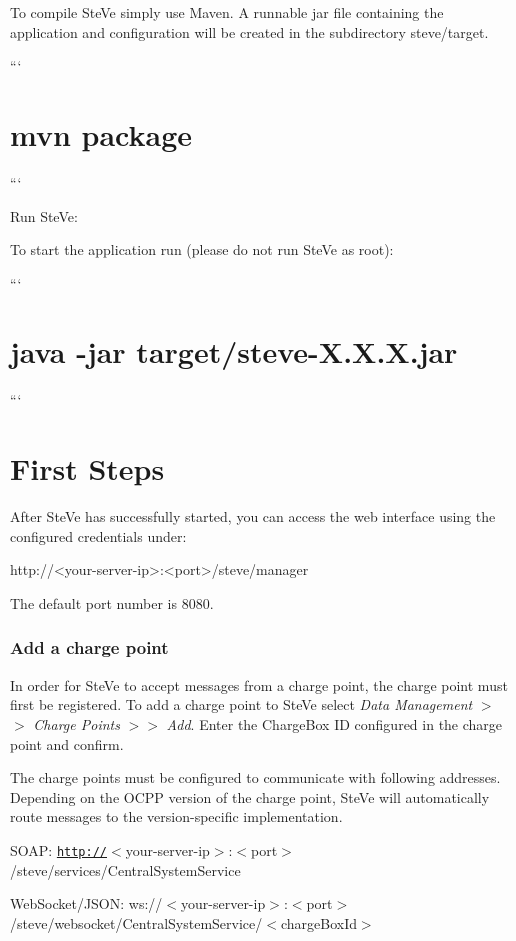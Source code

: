 \begin{DoxyEnumerate}
To compile Ste\+Ve simply use Maven. A runnable {\ttfamily jar} file containing the application and configuration will be created in the subdirectory {\ttfamily steve/target}.

``` \section*{mvn package}

```
\item Run Ste\+Ve\+:

To start the application run (please do not run Ste\+Ve as root)\+:

``` \section*{java -\/jar target/steve-\/\+X.\+X.\+X.\+jar}

```
\end{DoxyEnumerate}

\section*{First Steps}

After Ste\+Ve has successfully started, you can access the web interface using the configured credentials under\+: \begin{DoxyVerb}http://<your-server-ip>:<port>/steve/manager
\end{DoxyVerb}


The default port number is 8080.

\subsubsection*{Add a charge point}


\begin{DoxyEnumerate}
\item In order for Ste\+Ve to accept messages from a charge point, the charge point must first be registered. To add a charge point to Ste\+Ve select {\itshape Data Management} $>$$>$ {\itshape Charge Points} $>$$>$ {\itshape Add}. Enter the Charge\+Box I\+D configured in the charge point and confirm.
\item The charge points must be configured to communicate with following addresses. Depending on the O\+C\+P\+P version of the charge point, Ste\+Ve will automatically route messages to the version-\/specific implementation.
\begin{DoxyItemize}
\item S\+O\+A\+P\+: {\ttfamily \href{http://}{\tt http\+://}$<$your-\/server-\/ip$>$\+:$<$port$>$/steve/services/\+Central\+System\+Service}
\item Web\+Socket/\+J\+S\+O\+N\+: {\ttfamily ws\+://$<$your-\/server-\/ip$>$\+:$<$port$>$/steve/websocket/\+Central\+System\+Service/$<$charge\+Box\+Id$>$}
\end{DoxyItemize}
\end{DoxyEnumerate}

